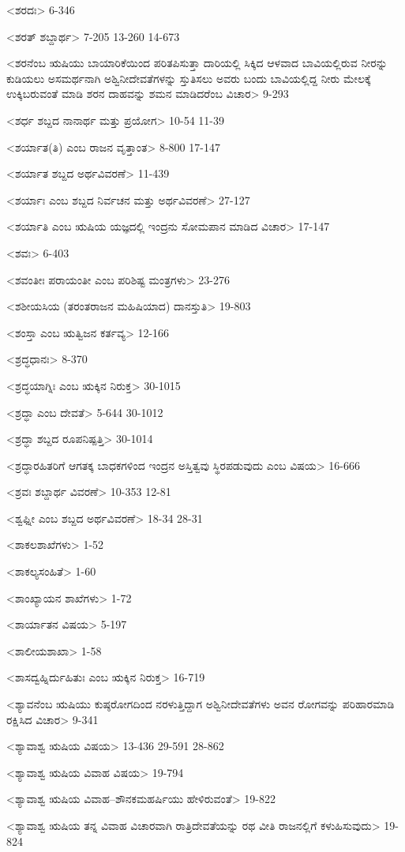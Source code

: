 <ಶರದಃ>
6-346

<ಶರತ್‍ ಶಬ್ದಾರ್ಥ>
7-205
13-260
14-673


<ಶರನೆಂಬ ಋಷಿಯು ಬಾಯಾರಿಕೆಯಿಂದ ಪರಿತಪಿಸುತ್ತಾ ದಾರಿಯಲ್ಲಿ ಸಿಕ್ಕಿದ ಆಳವಾದ ಬಾವಿಯಲ್ಲಿರುವ ನೀರನ್ನು ಕುಡಿಯಲು ಅಸಮರ್ಥನಾಗಿ ಅಶ್ವಿನೀದೇವತೆಗಳನ್ನು ಸ್ತುತಿಸಲು ಅವರು ಬಂದು ಬಾವಿಯಲ್ಲಿದ್ದ ನೀರು ಮೇಲಕ್ಕೆ ಉಕ್ಕಿಬರುವಂತೆ ಮಾಡಿ ಶರನ ದಾಹವನ್ನು ಶಮನ ಮಾಡಿದರೆಂಬ ವಿಚಾರ>
9-293

<ಶರ್ಧ ಶಬ್ದದ ನಾನಾರ್ಥ ಮತ್ತು ಪ್ರಯೋಗ>
10-54
11-39

<ಶರ್ಯಾತ(ತಿ) ಎಂಬ ರಾಜನ ವೃತ್ತಾಂತ>
8-800
17-147

<ಶರ್ಯಾತ ಶಬ್ದದ ಅರ್ಥವಿವರಣೆ>
11-439

<ಶರ್ಯಾಃ ಎಂಬ ಶಬ್ದದ ನಿರ್ವಚನ ಮತ್ತು ಅರ್ಥವಿವರಣೆ>
27-127

<ಶರ್ಯಾತಿ ಎಂಬ ಋಷಿಯ ಯಜ್ಞದಲ್ಲಿ ಇಂದ್ರನು ಸೋಮಪಾನ ಮಾಡಿದ ವಿಚಾರ>
17-147

<ಶವಃ>
6-403

<ಶವಂತೀಃ ಪರಾಯಂತೀ ಎಂಬ ಪರಿಶಿಷ್ಟ ಮಂತ್ರಗಳು>
23-276

<ಶಶೀಯಸಿಯ (ತರಂತರಾಜನ ಮಹಿಷಿಯಾದ) ದಾನಸ್ತುತಿ>
19-803

<ಶಂಸ್ತಾ ಎಂಬ ಋತ್ವಿಜನ ಕರ್ತವ್ಯ>
12-166

<ಶ್ರದ್ಧಧಾನಃ>
8-370

<ಶ್ರದ್ಧಯಾಗ್ನಿಃ ಎಂಬ ಋಕ್ಕಿನ ನಿರುಕ್ತ>
30-1015

<ಶ್ರದ್ಧಾ ಎಂಬ ದೇವತೆ>
5-644
30-1012

<ಶ್ರದ್ಧಾ ಶಬ್ದದ ರೂಪನಿಷ್ಪತ್ತಿ>
30-1014

<ಶ್ರದ್ಧಾರಹಿತರಿಗೆ ಆಗತಕ್ಕ ಬಾಧಕಗಳಿಂದ ಇಂದ್ರನ ಅಸ್ತಿತ್ವವು ಸ್ಥಿರಪಡುವುದು ಎಂಬ ವಿಷಯ>
16-666

<ಶ್ರವಃ ಶಬ್ದಾರ್ಥ ವಿವರಣೆ>
10-353
12-81

<ಶ್ವಫ್ನೀ ಎಂಬ ಶಬ್ದದ ಅರ್ಥವಿವರಣೆ>
18-34
28-31

<ಶಾಕಲಶಾಖೆಗಳು>
1-52

<ಶಾಕಲ್ಯಸಂಹಿತೆ>
1-60

<ಶಾಂಖ್ಯಾಯನ ಶಾಖೆಗಳು>
1-72

<ಶಾರ್ಯಾತನ ವಿಷಯ>
5-197

<ಶಾಲೀಯಶಾಖಾ>
1-58

<ಶಾಸದ್ವಹ್ನಿರ್ದುಹಿತುಃ ಎಂಬ ಋಕ್ಕಿನ ನಿರುಕ್ತ>
16-719

<ಶ್ಯಾವನೆಂಬ ಋಷಿಯು ಕುಷ್ಠರೋಗದಿಂದ ನರಳುತ್ತಿದ್ದಾಗ ಅಶ್ವಿನೀದೇವತೆಗಳು ಅವನ ರೋಗವನ್ನು ಪರಿಹಾರಮಾಡಿ ರಕ್ಷಿಸಿದ ವಿಚಾರ>
9-341

<ಶ್ಯಾವಾಶ್ವ ಋಷಿಯ ವಿಷಯ>
13-436
29-591
28-862

<ಶ್ಯಾವಾಶ್ವ ಋಷಿಯ ವಿವಾಹ ವಿಷಯ>
19-794

<ಶ್ಯಾವಾಶ್ವ ಋಷಿಯ ವಿವಾಹ–ಶೌನಕಮಹರ್ಷಿಯು ಹೇಳಿರುವಂತೆ>
19-822

<ಶ್ಯಾವಾಶ್ವ ಋಷಿಯ ತನ್ನ ವಿವಾಹ ವಿಚಾರವಾಗಿ ರಾತ್ರಿದೇವತೆಯನ್ನು ರಥ ವೀತಿ ರಾಜನಲ್ಲಿಗೆ ಕಳುಹಿಸುವುದು>
19-824

